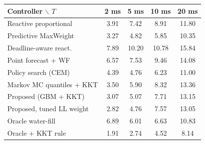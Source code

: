 \begin{tabular}{lcccc}
\hline
Controller $\backslash$ $T$ & 2 ms & 5 ms & 10 ms & 20 ms \\
\hline
Reactive proportional & 3.91 & 7.42 & 8.91 & 11.80 \\
Predictive MaxWeight & 3.27 & 4.82 & 5.85 & 10.35 \\
Deadline-aware react. & 7.89 & 10.20 & 10.78 & 15.84 \\
Point forecast + WF & 6.57 & 7.53 & 9.46 & 14.08 \\
Policy search (CEM) & 4.39 & 4.76 & 6.23 & 11.00 \\
Markov MC quantiles + KKT & 3.50 & 5.90 & 8.32 & 13.36 \\
Proposed (GBM + KKT) & 3.07 & 5.07 & 7.71 & 13.15 \\
Proposed, tuned LL weight & 2.82 & 4.76 & 7.57 & 13.05 \\
\hline
Oracle water-fill & 6.89 & 6.01 & 6.63 & 10.83 \\
Oracle + KKT rule & 1.91 & 2.74 & 4.52 & 8.14 \\
\hline
\end{tabular}
